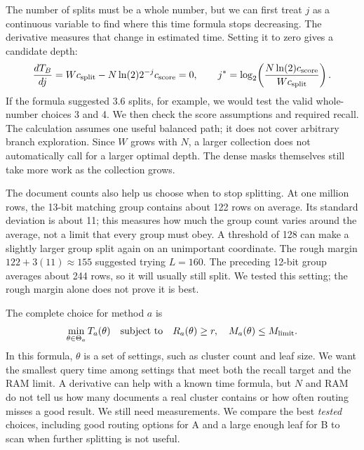 The number of splits must be a whole number, but we can first treat $j$ as a continuous
variable to find where this time formula stops decreasing. The derivative measures that
change in estimated time. Setting it to zero gives a candidate depth:
\[
\frac{dT_B}{dj}=Wc_{\rm split}-N\ln(2)2^{-j}c_{\rm score}=0,
\qquad
j^*=\log_2\!\left(\frac{N\ln(2)c_{\rm score}}{Wc_{\rm split}}\right).
\]
If the formula suggested 3.6 splits, for example, we would test the valid whole-number choices
3 and 4. We then check the score assumptions and required recall. The
calculation assumes one useful balanced path;
it does not cover arbitrary branch exploration. Since $W$ grows with $N$, a larger
collection does not automatically call for a larger optimal depth. The dense masks themselves
still take more work as the collection grows.

The document counts also help us choose when to stop splitting. At one million rows, the
13-bit matching group contains about 122 rows on average. Its standard deviation is about 11;
this measures how much the group count varies around the average, not a limit that every
group must obey. A threshold of 128 can make a slightly larger group split again on an
unimportant coordinate. The rough margin $122+3(11)\approx155$ suggested trying $L=160$.
The preceding 12-bit group averages about 244 rows, so it will usually still split. We tested
this setting; the rough margin alone does not prove it is best.

The complete choice for method $a$ is
\begin{equation}
\min_{\theta\in\Theta_a}T_a(\theta)
\quad\text{subject to}\quad R_a(\theta)\ge r,\quad M_a(\theta)\le M_{\rm limit}.
\label{eq:choice}
\end{equation}
In this formula, $\theta$ is a set of settings, such as cluster count and leaf size.
We want the smallest query time among settings that meet both the recall target and the RAM
limit. A derivative can help with a known time formula, but $N$ and RAM do not tell us how
many documents a real cluster contains or how often routing misses a good result. We still
need measurements. We compare the best \emph{tested} choices, including good routing options
for A and a large enough leaf for B to scan when further splitting is not useful.